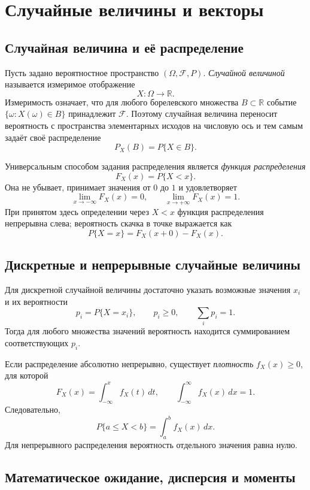 \section{Случайные величины и векторы}
\label{sec:random-variables-vectors}

\subsection{Случайная величина и её распределение}

Пусть задано вероятностное пространство $(\Omega,\mathcal F,P)$. \emph{Случайной
величиной} называется измеримое отображение
\[
    X:\Omega\to\mathbb R.
\]
Измеримость означает, что для любого борелевского множества $B\subset\mathbb R$
событие $\{\omega:X(\omega)\in B\}$ принадлежит $\mathcal F$. Поэтому случайная
величина переносит вероятность с пространства элементарных исходов на числовую
ось и тем самым задаёт своё распределение
\[
    P_X(B)=P\{X\in B\}.
\]

Универсальным способом задания распределения является \emph{функция
распределения}
\[
    F_X(x)=P\{X<x\}.
\]
Она не убывает, принимает значения от $0$ до $1$ и удовлетворяет
\[
    \lim_{x\to-\infty}F_X(x)=0,\qquad
    \lim_{x\to+\infty}F_X(x)=1.
\]
При принятом здесь определении через $X<x$ функция распределения непрерывна
слева; вероятность скачка в точке выражается как
\[
    P\{X=x\}=F_X(x+0)-F_X(x).
\]

\subsection{Дискретные и непрерывные случайные величины}

Для дискретной случайной величины достаточно указать возможные значения $x_i$
и их вероятности
\[
    p_i=P\{X=x_i\},\qquad p_i\geq0,\qquad \sum_i p_i=1.
\]
Тогда для любого множества значений вероятность находится суммированием
соответствующих $p_i$.

Если распределение абсолютно непрерывно, существует \emph{плотность}
$f_X(x)\geq0$, для которой
\[
    F_X(x)=\int_{-\infty}^{x} f_X(t)\,dt,
    \qquad
    \int_{-\infty}^{\infty}f_X(x)\,dx=1.
\]
Следовательно,
\[
    P\{a\leq X<b\}=\int_a^b f_X(x)\,dx.
\]
Для непрерывного распределения вероятность отдельного значения равна нулю.

\subsection{Математическое ожидание, дисперсия и моменты}

